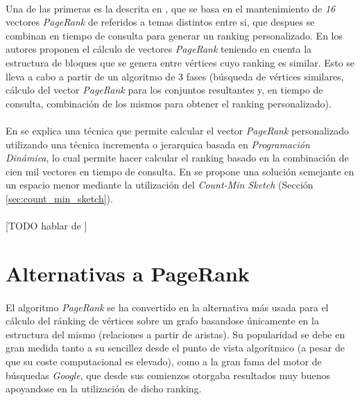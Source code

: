 \documentclass{subfiles}
\begin{document}
      \paragraph{}
      Una de las primeras es la descrita en \cite{haveliwala2002topic}, que se basa en el mantenimiento de \emph{16} vectores \emph{PageRank} de referidos a temas distintos entre si, que despues se combinan en tiempo de consulta para generar un ranking personalizado. En \cite{kamvar2003exploiting} los autores proponen el cálculo de vectores \emph{PageRank} teniendo en cuenta la estructura de bloques que se genera entre vértices cuyo ranking es similar. Esto se lleva a cabo a partir de un algoritmo de 3 fases (búsqueda de vértices similares, cálculo del vector \emph{PageRank} para los conjuntos resultantes y, en tiempo de consulta, combinación de los mismos para obtener el ranking personalizado).

      \paragraph{}
      En \cite{jeh2003scaling} se explica una técnica que permite calcular el vector \emph{PageRank} personalizado utilizando una técnica incrementa o jerarquica basada en \emph{Programación Dinámica}, lo cual permite hacer calcular el ranking basado en la combinación de cien mil vectores en tiempo de consulta. En \cite{sarlos2006randomize} se propone una solución semejante en un espacio menor mediante la utilización del \emph{Count-Min Sketch} (Sección \ref{sec:count_min_sketch}).

      \paragraph{}
      [TODO hablar de \cite{sarma2011estimating}]

    \section{Alternativas a PageRank}
    \label{sec:pagerank_alternativas}

      \paragraph{}
      El algoritmo \emph{PageRank} se ha convertido en la alternativa más usada para el cálculo del ránking de vértices sobre un grafo basandose únicamente en la estructura del mismo (relaciones a partir de aristas). Su popularidad se debe en gran medida tanto a su sencillez desde el punto de vista algorítmico (a pesar de que su coste computacional es elevado), como a la gran fama del motor de búsquedas \emph{Google}, que desde sus comienzos otorgaba resultados muy buenos apoyandose en la utilización de dicho ranking.
\end{document}
